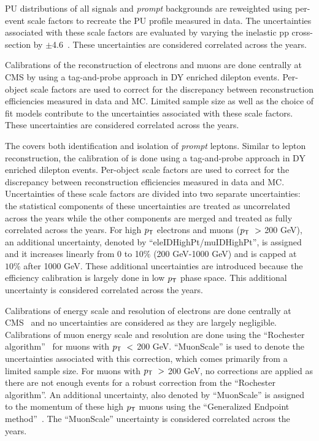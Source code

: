 \ac{PU} distributions of all signals and \emph{prompt} backgrounds are reweighted using per-event scale factors to recreate the \ac{PU} profile measured in data. The uncertainties associated with these scale factors are evaluated by varying the inelastic pp cross-section by $\pm$4.6~\cite{Sirunyan:2018nqx}. These uncertainties are considered correlated across the years.

Calibrations of the reconstruction of electrons and muons are done centrally at \ac{CMS} by using a tag-and-probe approach in \ac{DY} enriched dilepton events. Per-object scale factors are used to correct for the discrepancy between reconstruction efficiencies measured in data and \ac{MC}. Limited sample size as well as the choice of fit models contribute to the uncertainties associated with these scale factors. These uncertainties are considered correlated across the years.

The \TOP covers both identification and isolation of \emph{prompt} leptons. Similar to lepton reconstruction, the calibration of \TOP is done using a tag-and-probe approach in \ac{DY} enriched dilepton events. Per-object scale factors are used to correct for the discrepancy between reconstruction efficiencies measured in data and \ac{MC}. Uncertainties of these scale factors are divided into two separate uncertainties: the statistical components of these uncertainties are treated as uncorrelated across the years while the other components are merged and treated as fully correlated across the years. For high $p_{\textsf{T}}$ electrons and muons ($p_{\textsf{T}}~>$ 200 GeV), an additional uncertainty, denoted by ``eleIDHighPt/muIDHighPt'', is assigned and it increases linearly from 0 to 10$\%$ (200 GeV-1000 GeV) and is capped at $10\%$ after 1000 GeV. These additional uncertainties are introduced because the efficiency calibration is largely done in low $p_{\textsf{T}}$ phase space. This additional uncertainty is considered correlated across the years.

Calibrations of energy scale and resolution of electrons are done centrally at CMS~\cite{CMS:2013lxn} and no uncertainties are considered as they are largely negligible. Calibrations of muon energy scale and resolution are done using the ``Rochester algorithm''~\cite{Bodek:2012id} for muons with $p_{\textsf{T}}~<$ 200 GeV. ``MuonScale'' is used to denote the uncertainties associated with this correction, which comes primarily from a limited sample size. For muons with $p_{\textsf{T}}~>$ 200 GeV, no corrections are applied as there are not enough events for a robust correction from the ``Rochester algorithm''. An additional uncertainty, also denoted by ``MuonScale'' is assigned to the momentum of these high $p_{\textsf{T}}$ muons using the ``Generalized Endpoint method''~\cite{CMS:2018rym}. The ``MuonScale'' uncertainty is considered correlated across the years.

